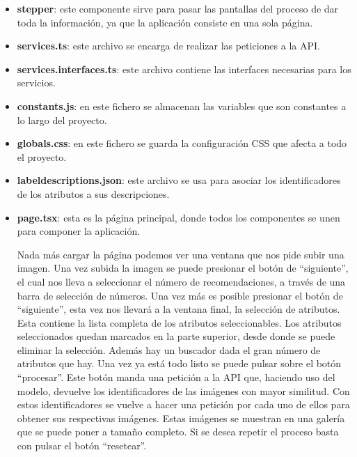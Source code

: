 \documentclass[12pt]{report} %
\begin{document}
\begin{itemize}
\begin{figure}[H]
		\end{figure}
		\item \textbf{stepper}: este componente sirve para pasar las pantallas del proceso de dar toda la información,
		ya que la aplicación consiste en una sola página.
		\item \textbf{services.ts}: este archivo se encarga de realizar las peticiones a la API.
		\item \textbf{services.interfaces.ts}: este archivo contiene las interfaces necesarias para los servicios.
		\item \textbf{constants.js}: en este fichero se almacenan las variables que son constantes a lo largo del proyecto.
		\item \textbf{globals.css}: en este fichero se guarda la configuración CSS que afecta a todo el proyecto.
		\item \textbf{label\textunderscore descriptions.json}: este archivo se usa para asociar los identificadores de los atributos
		a sus descripciones.
		\item \textbf{page.tsx}: esta es la página principal, donde todos los componentes se unen para componer la aplicación.
		

		Nada más cargar la página podemos ver una ventana que nos pide subir una imagen. Una vez subida la imagen
		se puede presionar el botón de ``siguiente'', el cual nos lleva a seleccionar el número de recomendaciones, 
		a través de una barra de selección de números. Una vez más es posible presionar el botón
		de ``siguiente'', esta vez nos llevará a la ventana final, la selección de atributos. Esta contiene la lista completa de los 
		atributos seleccionables. Los atributos seleccionados quedan marcados en la parte superior, desde donde se puede 
		eliminar la selección. Además hay un buscador dada el gran número de atributos que hay. Una vez ya está todo listo se
		puede pulsar sobre el botón ``procesar''. Este botón manda una petición a la API que, haciendo uso del modelo, devuelve los
		identificadores de las imágenes con mayor similitud. Con estos identificadores se vuelve a hacer una petición por cada uno de
		ellos para obtener sus respectivas imágenes. Estas imágenes se muestran en una galería que se puede poner a tamaño completo.
		Si se desea repetir el proceso basta con pulsar el botón ``resetear''.


\end{itemize}
\end{document}
